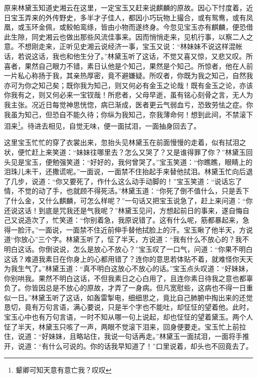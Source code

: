 \documentclass[12pt,oneside]{book}
\begin{document}
原来林黛玉知道史湘云在这里，一定宝玉又赶来说麒麟的原故。因心下忖度着，近日宝玉弄来的外传野史，多半才子佳人，都因小巧玩物上撮合，或有鸳鸯，或有凤凰，或玉环金佩，或鲛帕鸾绦，皆由小物而遂终身。今忽见宝玉亦有麒麟，便恐借此生隙，同史湘云也做出那些风流佳事来。因而悄悄走来，见机行事，以察二人之意。不想刚走来，正听见史湘云说经济一事，宝玉又说：“林妹妹不说这样混帐话，若说这话，我也和他生分了。”林黛玉听了这话，不觉又喜又惊，又悲又叹。所喜者，果然自己眼力不错，素日认他是个知己，果然是个知己。所惊者，他在人前一片私心称扬于我，其亲热厚密，竟不避嫌疑。所叹者，你既为我之知己，自然我亦可为你之知己矣；既你我为知己，则又何必有金玉之论哉！既有金玉之论，亦该你我有之，则又何必来一宝钗哉！所悲者，父母早逝，虽有铭心刻骨之言，无人为我主张。况近日每觉神思恍惚，病已渐成，医者更云气弱血亏，恐致劳怯之症。你我虽为知己，但恐自不能久待；你纵为我知己，奈我薄命何！想到此间，不禁滚下泪来\footnote{颦卿可知天意有意亡我？叹叹}。待进去相见，自觉无味，便一面拭泪，一面抽身回去了。

这里宝玉忙忙的穿了衣裳出来，忽抬头见林黛玉在前面慢慢的走着，似有拭泪之状，便忙赶上来笑道：“妹妹往哪里去？怎么又哭了？又是谁得罪了你？”林黛玉回头见是宝玉，便勉强笑道：“好好的，我何曾哭了。”宝玉笑道：“你瞧瞧，眼睛上的泪珠儿未干，还撒谎呢。”一面说，一面禁不住抬起手来替他拭泪。林黛玉忙向后退了几步，说道：“你又要死了，作什么这么动手动脚的！”宝玉笑道：“说话忘了情，不觉的动了手，也就顾不得死活。”林黛玉道：“你死了倒不值什么，只是丢下了什么金，又什么麒麟，可怎么样呢？”一句话又把宝玉说急了，赶上来问道：“你还说这话！到底是咒我还是气我呢？”林黛玉见问，方想起前日的事来，遂自悔自己又说造次了，忙笑道：“你别着急，我原说错了。这有什么呢，筋都暴起来，急得一脸汗。”一面说，一面禁不住近前伸手替他拭脸上的汗。宝玉瞅了他半天，方说道“你放心”三个字。林黛玉听了，怔了半天，方说道：“我有什么不放心的？我不明白这话。你倒说说，怎么是放心不放心？”宝玉叹了一口气，问道：“你果不明白这话？难道我素日在你身上的心都用错了？连你的意思若体贴不着，就难怪你天天为我生气了。”林黛玉道：“真不明白这放心不放心的话。”宝玉点头叹道：“好妹妹，你别哄我。果然不明白这话，不但我素日之心白用了，且连你素日待我之意也都辜负了。你皆因总是不放心的原故，才弄了一身病。但凡宽慰些，这病也不得一日重似一日。”林黛玉听了这话，如轰雷掣电，细细思之，竟比自己肺腑中掏出来的还觉恳切，竟有万句言语，满心要说，只是半个字也不能吐，却怔怔的望着他。此时，宝玉心中也有万句言语，一时不知从哪一句上说起，却也怔怔的望着黛玉。两个人怔了半天，林黛玉只咳了一声，两眼不觉滚下泪来，回身便要走。宝玉忙上前拉住，说道：“好妹妹，且略站住，我说一句话再走。”林黛玉一面拭泪，一面将手推开，说道：“有什么可说的。你的话我早知道了！”口里说着，却头也不回竟去了。
\end{document}
